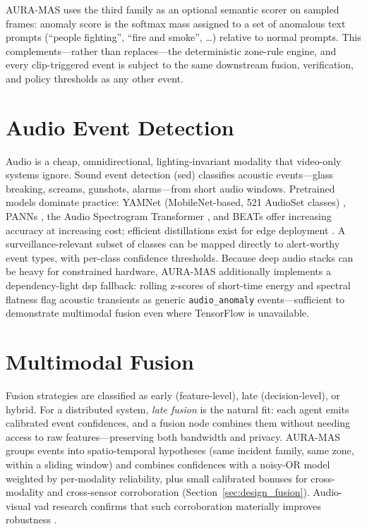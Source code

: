 AURA-MAS uses the third family as an optional semantic scorer on sampled frames: anomaly score is the softmax mass assigned to a set of anomalous text prompts (``people fighting'', ``fire and smoke'', \ldots) relative to normal prompts. This complements---rather than replaces---the deterministic zone-rule engine, and every \gls{clip}-triggered event is subject to the same downstream fusion, verification, and policy thresholds as any other event.

\section{Audio Event Detection}

Audio is a cheap, omnidirectional, lighting-invariant modality that video-only systems ignore. Sound event detection (\gls{sed}) classifies acoustic events---glass breaking, screams, gunshots, alarms---from short audio windows. Pretrained models dominate practice: YAMNet (MobileNet-based, 521 AudioSet classes) \cite{tensorflow_yamnet, hershey2017cnn}, PANNs \cite{kong2019panns}, the Audio Spectrogram Transformer \cite{li2023ast}, and BEATs \cite{chen2022beats} offer increasing accuracy at increasing cost; efficient distillations exist for edge deployment \cite{schmid2024improving, saradopoulos2025real}. A surveillance-relevant subset of classes can be mapped directly to alert-worthy event types, with per-class confidence thresholds. Because deep audio stacks can be heavy for constrained hardware, AURA-MAS additionally implements a dependency-light \gls{dsp} fallback: rolling z-scores of short-time energy and spectral flatness flag acoustic transients as generic \texttt{audio\_anomaly} events---sufficient to demonstrate multimodal fusion even where TensorFlow is unavailable.

\section{Multimodal Fusion}

Fusion strategies are classified as early (feature-level), late (decision-level), or hybrid. For a distributed system, \emph{late fusion} is the natural fit: each agent emits calibrated event confidences, and a fusion node combines them without needing access to raw features---preserving both bandwidth and privacy. AURA-MAS groups events into spatio-temporal hypotheses (same incident family, same zone, within a sliding window) and combines confidences with a noisy-OR model weighted by per-modality reliability, plus small calibrated bonuses for cross-modality and cross-sensor corroboration (Section~\ref{sec:design_fusion}). Audio-visual \gls{vad} research confirms that such corroboration materially improves robustness \cite{wu2025avadclip, ustun2026multimodal}.

